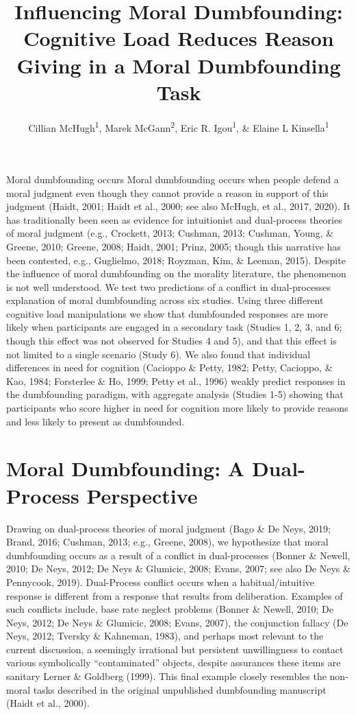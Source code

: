 \documentclass[
  american,
  man,floatsintext]{apa7}
\title{Influencing Moral Dumbfounding: Cognitive Load Reduces Reason Giving in a Moral Dumbfounding Task}
\author{Cillian McHugh\textsuperscript{1}, Marek McGann\textsuperscript{2}, Eric R. Igou\textsuperscript{1}, \& Elaine L Kinsella\textsuperscript{1}}
\date{}
\affiliation{\vspace{0.5cm}\textsuperscript{1} University of Limerick\\\textsuperscript{2} Mary Immaculate College \textasciitilde{} University of Limerick}
\begin{document}
\maketitle

Moral dumbfounding occurs Moral dumbfounding occurs when people defend a moral judgment even though they cannot provide a reason in support of this judgment (Haidt, 2001; Haidt et al., 2000; see also McHugh, et al., 2017, 2020). It has traditionally been seen as evidence for intuitionist and dual-process theories of moral judgment (e.g., Crockett, 2013; Cushman, 2013; Cushman, Young, \& Greene, 2010; Greene, 2008; Haidt, 2001; Prinz, 2005; though this narrative has been contested, e.g., Guglielmo, 2018; Royzman, Kim, \& Leeman, 2015). Despite the influence of moral dumbfounding on the morality literature, the phenomenon is not well understood. We test two predictions of a conflict in dual-processes explanation of moral dumbfounding across six studies. Using three different cognitive load manipulations we show that dumbfounded responses are more likely when participants are engaged in a secondary task (Studies 1, 2, 3, and 6; though this effect was not observed for Studies 4 and 5), and that this effect is not limited to a single scenario (Study 6). We also found that individual differences in need for cognition (Cacioppo \& Petty, 1982; Petty, Cacioppo, \& Kao, 1984; Forsterlee \& Ho, 1999; Petty et al., 1996) weakly predict responses in the dumbfounding paradigm, with aggregate analysis (Studies 1-5) showing that participants who score higher in need for cognition more likely to provide reasons and less likely to present as dumbfounded.

\hypertarget{moral-dumbfounding-a-dual-process-perspective}{%
\section{Moral Dumbfounding: A Dual-Process Perspective}\label{moral-dumbfounding-a-dual-process-perspective}}

Drawing on dual-process theories of moral judgment (Bago \& De Neys, 2019; Brand, 2016; Cushman, 2013; e.g., Greene, 2008), we hypothesize that moral dumbfounding occurs as a result of a conflict in dual-processes (Bonner \& Newell, 2010; De Neys, 2012; De Neys \& Glumicic, 2008; Evans, 2007; see also De Neys \& Pennycook, 2019). Dual-Process conflict occurs when a habitual/intuitive response is different from a response that results from deliberation. Examples of such conflicts include, base rate neglect problems (Bonner \& Newell, 2010; De Neys, 2012; De Neys \& Glumicic, 2008; Evans, 2007), the conjunction fallacy (De Neys, 2012; Tversky \& Kahneman, 1983), and perhaps most relevant to the current discussion, a seemingly irrational but persistent unwillingness to contact various symbolically ``contaminated'' objects, despite assurances these items are sanitary Lerner \& Goldberg (1999). This final example closely resembles the non-moral tasks described in the original unpublished dumbfounding manuscript (Haidt et al., 2000).
\end{document}
